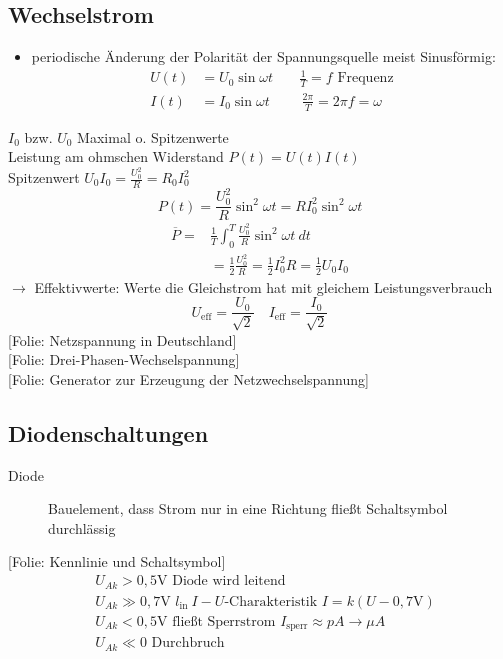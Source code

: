 \documentclass[titlepage,12pt,a4paper,ngerman]{report}
\newcommand{\tx}[1]{\textrm{#1}}
\newcommand{\folie}[1]{\color{gray}[Folie: #1]\color{black}}
\begin{document}
\subsection{Wechselstrom}
\begin{itemize}
	\item periodische Änderung der Polarität der Spannungsquelle meist Sinusförmig: 
	\begin{align*}
	U(t) &= U_0 \sin \omega t \quad \ \ \ \ \frac{1}{T} = f \tx{ Frequenz}\\
	I(t) &= I_0 \sin \omega t \; \quad \quad \frac{2 \pi}{T}= 2 \pi f = \omega
	\end{align*}
\end{itemize}
$I_0$ bzw. $U_0$ Maximal o. Spitzenwerte\\
Leistung am ohmschen Widerstand $P(t) = U(t) I(t)$\\
Spitzenwert $U_0 I_0 = \frac{U_0^2}{R}= R_0 I_0^2$ 
$$P(t) = \frac{U_0^2}{R} \sin^2 \omega t = R I_0^2 \sin^2 \omega t$$
\begin{align*}
\overline{P} =& \frac{1}{T} \int_0^T \frac{U_0^2}{R} \sin^2 \omega t\ dt\\
&= \frac{1}{2}\frac{U_0^2}{R} = \frac{1}{2}I_0^2 R = \frac{1}{2}U_0 I_0
\end{align*}
$\rightarrow$ Effektivwerte: Werte die Gleichstrom hat mit gleichem Leistungsverbrauch
$$U_{\tx{eff}} = \frac{U_0}{\sqrt{2}} \quad I_{\tx{eff}} = \frac{I_0}{\sqrt{2}}$$
\folie{Netzspannung in Deutschland}\\
\folie{Drei-Phasen-Wechselspannung}\\
\folie{Generator zur Erzeugung der Netzwechselspannung}

\subsection{Diodenschaltungen}
\begin{description}
	\item [Diode] Bauelement, dass Strom nur in eine Richtung fließt Schaltsymbol %
	durchlässig
\end{description}
\folie{Kennlinie und Schaltsymbol}
\begin{align*}
&U_{Ak} > 0,5 \tx{V  Diode wird leitend}\\
&U_{Ak} \gg 0,7 \tx{V  }l_{\tx{in}}\ I-U\tx{-Charakteristik }I = k (U-0,7\tx{V})\\
&U_{Ak} < 0,5 \tx{V  fließt Sperrstrom } I_{\tx{sperr}} \approx pA \rightarrow \mu A\\
&U_{Ak} \ll 0 \tx{ Durchbruch} 
\end{align*}
\end{document}
